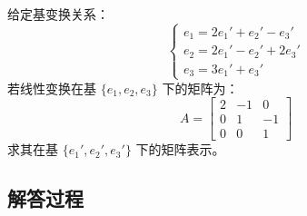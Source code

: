 \begin{example}[基变换矩阵]
    给定基变换关系：
    \[
    \begin{cases}
    e_1 = 2e_1' + e_2' - e_3' \\
    e_2 = 2e_1' - e_2' + 2e_3' \\
    e_3 = 3e_1' + e_3'
    \end{cases}
    \]
    若线性变换在基 \(\{e_1, e_2, e_3\}\) 下的矩阵为：
    \[
    A = \begin{bmatrix} 2 & -1 & 0 \\ 0 & 1 & -1 \\ 0 & 0 & 1 \end{bmatrix}
    \]
    求其在基 \(\{e_1', e_2', e_3'\}\) 下的矩阵表示。
    \end{example}
    
    \subsection*{解答过程}
    